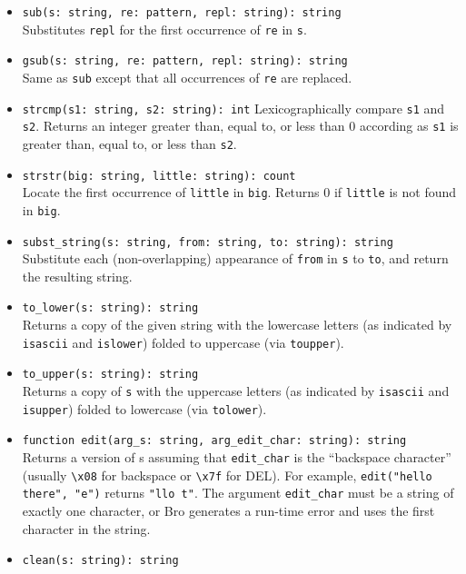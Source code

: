 \documentclass[10pt,landscape]{article}
\begin{document}
\begin{multicols*}{2}
\begin{itemize}
  \item \verb|sub(s: string, re: pattern, repl: string): string|\\
    Substitutes \texttt{repl} for the first occurrence of \texttt{re} in
    \texttt{s}.
  \item \verb|gsub(s: string, re: pattern, repl: string): string|\\
    Same as \texttt{sub} except that all occurrences of \texttt{re} are
    replaced.
  \item \verb|strcmp(s1: string, s2: string): int|
    Lexicographically compare \texttt{s1} and \texttt{s2}. Returns an integer
    greater than, equal to, or less than 0 according as \texttt{s1} is greater
    than, equal to, or less than \texttt{s2}.
  \item \verb|strstr(big: string, little: string): count|\\
    Locate the first occurrence of \texttt{little} in \texttt{big}.
    Returns 0 if \texttt{little} is not found in \texttt{big}.
  \item \verb|subst_string(s: string, from: string, to: string): string|\\
    Substitute each (non-overlapping) appearance of \texttt{from} in
    \texttt{s} to \texttt{to}, and return the resulting string.
  \item \verb|to_lower(s: string): string|\\
    Returns a copy of the given string with the lowercase letters (as indicated
    by \verb|isascii| and \verb|islower|) folded to uppercase (via
    \verb|toupper|).
  \item \verb|to_upper(s: string): string|\\
    Returns a copy of \verb|s| with the uppercase letters (as indicated by
    \verb|isascii| and \verb|isupper|) folded to lowercase (via
    \verb|tolower|).
  \item \verb|function edit(arg_s: string, arg_edit_char: string): string|\\
    Returns a version of s assuming that \verb|edit_char| is the ``backspace
    character'' (usually \verb|\x08| for backspace or \verb|\x7f| for DEL). For
    example, \verb|edit("hello there", "e")| returns \verb|"llo t"|. The
    argument \verb|edit_char| must be a string of exactly one character, or Bro
    generates a run-time error and uses the first character in the string.
  \item \verb|clean(s: string): string|\\

\end{itemize}
\end{multicols*}
\end{document}
